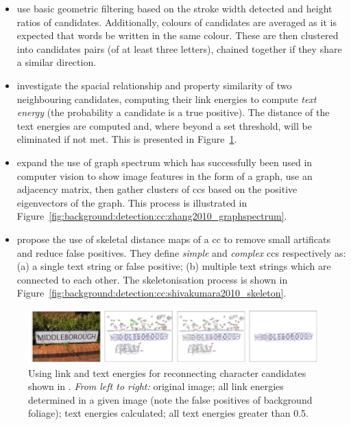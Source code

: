 \begin{itemize}
  \item \citet{Epshtein:2010tj} use basic geometric filtering based on the stroke width detected and height ratios of candidates. Additionally, colours of candidates are averaged as it is expected that words be written in the same colour. These are then clustered into candidates pairs (of at least three letters), chained together if they share a similar direction.
  \item \citet{Zhang:2011cl} investigate the spacial relationship and property similarity of two neighbouring candidates, computing their link energies to compute \textit{text energy} (the probability a candidate is a true positive). The distance of the text energies are computed and, where beyond a set threshold, will be eliminated if not met. This is presented in Figure~\ref{fig:background:detection:cc:zhang2011_textenergy}.
  \item \citet{Zhang:2010wa} expand the use of graph spectrum which has successfully been used in computer vision \citep{Sarkar:1996ig} to show image features in the form of a graph, use an adjacency matrix, then gather clusters of \glspl{cc} based on the positive eigenvectors of the graph. This process is illustrated in Figure~\ref{fig:background:detection:cc:zhang2010_graphspectrum}.
  \item \citet{Shivakumara:2011dn} propose the use of skeletal distance maps of a \gls{cc} to remove small artificats and reduce false positives. They define \textit{simple} and \textit{complex} \glspl{cc} respectively as: (a) a single text string or false positive; (b) multiple text strings which are connected to each other. The skeletonisation process is shown in Figure~\ref{fig:background:detection:cc:shivakumara2010_skeleton}.
\end{itemize}

\begin{figure}[p!]
  \centering
  \includegraphics[width=\textwidth]{images/background/zhang2011_textenergy}
  \caption[Text energy for connecting candidates back together]{Using link and text energies for reconnecting character candidates shown in \citet{Zhang:2011cl}. \textit{From left to right:} original image; all link energies determined in a given image (note the false positives of background foliage); text energies calculated; all text energies greater than 0.5.}
  \label{fig:background:detection:cc:zhang2011_textenergy}
\end{figure}

